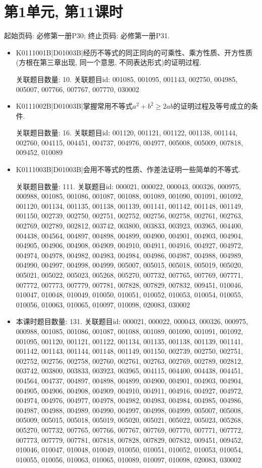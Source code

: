 \section*{第1单元, 第11课时}
起始页码: 必修第一册P30; 终止页码: 必修第一册P31.
\begin{itemize}
\item K0111001B|D01003B|经历不等式的同正同向的可乘性、乘方性质、开方性质(方根在第三章出现, 同一个意思, 不同表达形式)的证明过程.

关联题目数量: 10. 关联题目id: 001085, 001095, 001143, 002750, 004985, 005007, 007766, 007767, 007770, 030002

\item K0111002B|D01003B|掌握常用不等式$a^2+b^2 \ge 2ab$的证明过程及等号成立的条件.

关联题目数量: 16. 关联题目id: 001120, 001121, 001122, 001138, 001144, 002760, 004115, 004451, 004737, 004976, 004977, 005008, 005009, 007818, 009452, 010089

\item K0111003B|D01003B|会用不等式的性质、作差法证明一些简单的不等式.

关联题目数量: 111. 关联题目id: 000021, 000022, 000043, 000326, 000975, 000988, 001085, 001086, 001087, 001088, 001089, 001090, 001091, 001092, 001120, 001134, 001135, 001138, 001139, 001141, 001142, 001148, 001149, 001150, 002739, 002750, 002751, 002752, 002756, 002758, 002761, 002763, 002769, 002789, 002812, 003742, 003800, 003833, 003923, 003965, 004400, 004438, 004564, 004897, 004898, 004899, 004900, 004901, 004903, 004904, 004905, 004906, 004908, 004909, 004910, 004911, 004916, 004927, 004972, 004974, 004978, 004982, 004983, 004984, 004986, 004987, 004988, 004989, 004990, 004997, 004998, 004999, 005007, 005015, 005018, 005019, 005020, 005021, 005022, 005023, 005268, 005270, 007732, 007765, 007769, 007771, 007772, 007773, 007779, 007781, 007828, 007829, 007832, 009451, 010046, 010047, 010048, 010049, 010050, 010051, 010052, 010053, 010054, 010055, 010056, 010063, 010065, 010097, 010098, 020083, 030002

\item 本课时题目数量: 131. 关联题目id: 000021, 000022, 000043, 000326, 000975, 000988, 001085, 001086, 001087, 001088, 001089, 001090, 001091, 001092, 001095, 001120, 001121, 001122, 001134, 001135, 001138, 001139, 001141, 001142, 001143, 001144, 001148, 001149, 001150, 002739, 002750, 002751, 002752, 002756, 002758, 002760, 002761, 002763, 002769, 002789, 002812, 003742, 003800, 003833, 003923, 003965, 004115, 004400, 004438, 004451, 004564, 004737, 004897, 004898, 004899, 004900, 004901, 004903, 004904, 004905, 004906, 004908, 004909, 004910, 004911, 004916, 004927, 004972, 004974, 004976, 004977, 004978, 004982, 004983, 004984, 004985, 004986, 004987, 004988, 004989, 004990, 004997, 004998, 004999, 005007, 005008, 005009, 005015, 005018, 005019, 005020, 005021, 005022, 005023, 005268, 005270, 007732, 007765, 007766, 007767, 007769, 007770, 007771, 007772, 007773, 007779, 007781, 007818, 007828, 007829, 007832, 009451, 009452, 010046, 010047, 010048, 010049, 010050, 010051, 010052, 010053, 010054, 010055, 010056, 010063, 010065, 010089, 010097, 010098, 020083, 030002

\end{itemize}

